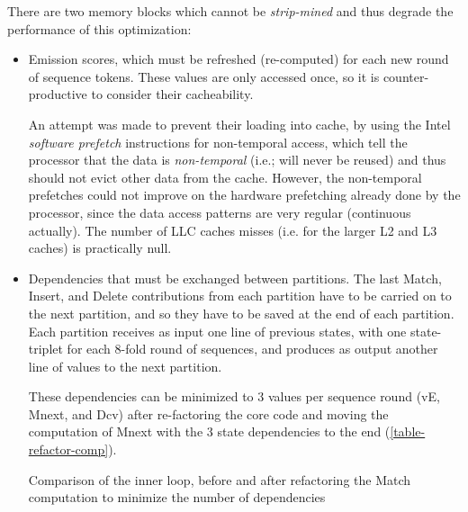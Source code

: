 There are two memory blocks which cannot be \emph{strip-mined} and thus degrade the performance of this optimization:

\begin {itemize}

\item Emission scores, which must be refreshed (re-computed) for each new round of sequence tokens. These values are only accessed once, so it is counter-productive to consider their cacheability.

\label{prefetching}
An attempt was made to prevent their loading into cache, by using the Intel \emph{software prefetch} instructions for non-temporal access, which tell the processor that the data is \emph{non-temporal} (i.e.; will never be reused) and thus should not evict other data from the cache. 
However, the non-temporal prefetches could not improve on the hardware prefetching already done by the processor, since the data access patterns are very regular (continuous actually). The number of LLC caches misses (i.e. for the larger L2 and L3 caches) is practically null.


\item Dependencies that must be exchanged between partitions. The last Match, Insert, and Delete contributions from each partition have to be carried on to the next partition, and so they have to be saved at the end of each partition. Each partition receives as input one line of previous states, with one state-triplet for each 8-fold round of sequences, and produces as output another line of values to the next partition. 

These dependencies can be minimized to 3 values per sequence round (vE, Mnext, and Dcv) after re-factoring the core code and moving the computation of Mnext with the 3 state dependencies to the end (\autoref{table-refactor-comp}).

\begin{table}[htb!]
\centering
\caption[Inner loop code, before and after refactoring the Match dependencies] {Comparison of the inner loop, before and after refactoring the Match computation to minimize the number of dependencies}
\label{table-refactor-comp}


\end{table}
\end{itemize}
